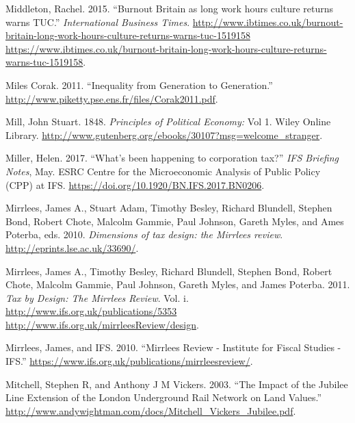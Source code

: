 \documentclass[]{tufte-handout}
\begin{document}
\leavevmode\hypertarget{ref-RachelMiddleton2015}{}%
Middleton, Rachel. 2015. ``Burnout Britain as long work hours culture
returns warns TUC.'' \emph{International Business Times}.
\href{http://www.ibtimes.co.uk/burnout-britain-long-work-hours-culture-returns-warns-tuc-1519158\%20https://www.ibtimes.co.uk/burnout-britain-long-work-hours-culture-returns-warns-tuc-1519158}{http://www.ibtimes.co.uk/burnout-britain-long-work-hours-culture-returns-warns-tuc-1519158 https://www.ibtimes.co.uk/burnout-britain-long-work-hours-culture-returns-warns-tuc-1519158}.

\leavevmode\hypertarget{ref-MilesCorak2011}{}%
Miles Corak. 2011. ``Inequality from Generation to Generation.''
\url{http://www.piketty.pse.ens.fr/files/Corak2011.pdf}.

\leavevmode\hypertarget{ref-mill1848principles}{}%
Mill, John Stuart. 1848. \emph{Principles of Political Economy:} Vol 1.
Wiley Online Library.
\url{http://www.gutenberg.org/ebooks/30107?msg=welcome_stranger}.

\leavevmode\hypertarget{ref-Miller2017}{}%
Miller, Helen. 2017. ``What's been happening to corporation tax?''
\emph{IFS Briefing Notes}, May. ESRC Centre for the Microeconomic
Analysis of Public Policy (CPP) at IFS.
\url{https://doi.org/10.1920/BN.IFS.2017.BN0206}.

\leavevmode\hypertarget{ref-Mirrlees2010d}{}%
Mirrlees, James A., Stuart Adam, Timothy Besley, Richard Blundell,
Stephen Bond, Robert Chote, Malcolm Gammie, Paul Johnson, Gareth Myles,
and Ames Poterba, eds. 2010. \emph{Dimensions of tax design: the
Mirrlees review}. \url{http://eprints.lse.ac.uk/33690/}.

\leavevmode\hypertarget{ref-Mirrlees2011}{}%
Mirrlees, James A., Timothy Besley, Richard Blundell, Stephen Bond,
Robert Chote, Malcolm Gammie, Paul Johnson, Gareth Myles, and James
Poterba. 2011. \emph{Tax by Design: The Mirrlees Review}. Vol. i.
\href{http://www.ifs.org.uk/publications/5353\%20http://www.ifs.org.uk/mirrleesReview/design}{http://www.ifs.org.uk/publications/5353 http://www.ifs.org.uk/mirrleesReview/design}.

\leavevmode\hypertarget{ref-Mirrlees2010}{}%
Mirrlees, James, and IFS. 2010. ``Mirrlees Review - Institute for Fiscal
Studies - IFS.''
\url{https://www.ifs.org.uk/publications/mirrleesreview/}.

\leavevmode\hypertarget{ref-Mitchell}{}%
Mitchell, Stephen R, and Anthony J M Vickers. 2003. ``The Impact of the
Jubilee Line Extension of the London Underground Rail Network on Land
Values.''
\url{http://www.andywightman.com/docs/Mitchell_Vickers_Jubilee.pdf}.
\end{document}
